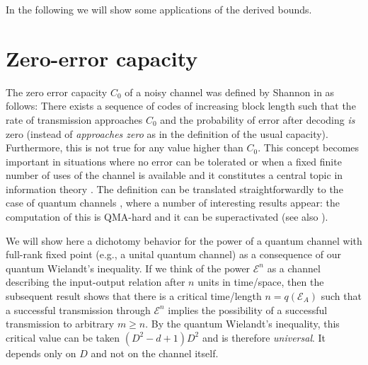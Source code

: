 \documentclass[journal,twoside]{IEEEtran}
\newcommand{\1}{\mathbbm{1}}
\def\E{{\cal E}}
\renewcommand{\>}{\rangle}
\newcommand{\<}{\langle}
\def\E{\mathcal{E}}
\begin{document}
In the following we will show some applications of the derived
bounds.


\section{Zero-error capacity}

The zero error capacity $C_0$ of a noisy channel was defined by
Shannon in \cite{Shannon} as follows: There exists a sequence of
codes of increasing block length such that the
rate of transmission approaches $C_0$ and the probability of error
after decoding  {\it is} zero (instead of {\it
approaches zero} as in the definition of the usual capacity).
Furthermore, this is not true for any value higher than $C_0$. This
concept becomes important in situations where no error can be
tolerated or when a fixed finite number of uses of the channel is
available and it constitutes a central topic in information theory
\cite{zero-review}. The definition can be translated
straightforwardly to the case of quantum channels \cite{Medeiros},
where a number of interesting results appear: the computation of
this is QMA-hard \cite{Shor} and it can be superactivated
\cite{Cubitt} (see also \cite{Duan,Duan1}).

We will show here a dichotomy behavior for the power of a quantum
channel with full-rank fixed point (e.g., a unital quantum channel)
as a consequence of our quantum Wielandt's inequality. If we think
of the power $\E^n$ as a channel describing the input-output
relation after $n$ units in time/space, then the subsequent result
shows that there is a critical time/length $n=q(\E_A)$ such that a
successful transmission through $\E^n$ implies the possibility of a
successful transmission to arbitrary $m\geq n$. By the quantum Wielandt's inequality, this critical value can be taken $(D^2-d+1)D^2$ and is therefore {\it universal}. It depends only on $D$ and not on the channel itself.
\end{document}
